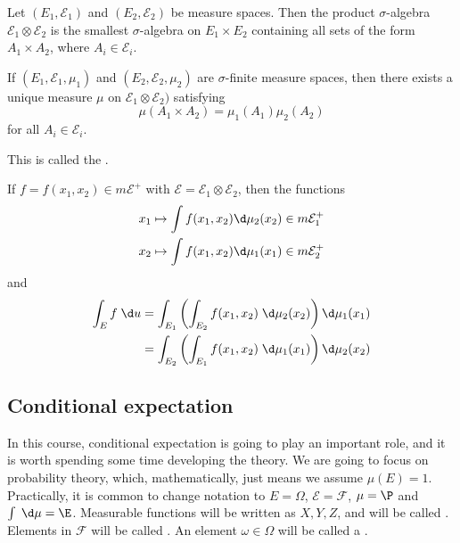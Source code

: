 \documentclass[a4paper]{article}
\begin{document}
\begin{defi}
  Let $(E_1, \mathcal{E}_1)$ and $(E_2 , \mathcal{E}_2)$ be measure spaces. Then the product $\sigma$-algebra$ \mathcal{E}_1 \otimes \mathcal{E}_2$ is the smallest $\sigma$-algebra on $E_1 \times E_2$ containing all sets of the form $A_1 \times A_2$, where $A_i \in \mathcal{E}_i$.
\end{defi}

\begin{thm}
  If $(E_1, \mathcal{E}_1, \mu_1)$ and $(E_2, \mathcal{E}_2, \mu_2)$ are $\sigma$-finite measure spaces, then there exists a unique measure $\mu$ on $\mathcal{E}_1 \otimes \mathcal{E}_2)$ satisfying
  \[
    \mu(A_1 \times A_2) = \mu_1(A_1) \mu_2(A_2)
  \]
  for all $A_i \in \mathcal{E}_i$.

  This is called the .
\end{thm}

\begin{thm}
  If $f = f(x_1, x_2) \in m\mathcal{E}^+$ with $\mathcal{E} = \mathcal{E}_1 \otimes \mathcal{E}_2$, then the functions
  \begin{align*}
    x_1 \mapsto \int f(x_1, x_2) \d \mu_2(x_2) \in m \mathcal{E}_1^+\\
    x_2 \mapsto \int f(x_1, x_2) \d \mu_1(x_1) \in m \mathcal{E}_2^+
  \end{align*}
  and
  \begin{align*}
    \int_E f \;\d u &= \int_{E_1} \left(\int_{E_2} f(x_1, x_2)\;\d \mu_2(x_2)\right) \d \mu_1(x_1)\\
    &= \int_{E_2} \left(\int_{E_1} f(x_1, x_2)\;\d \mu_1(x_1)\right) \d \mu_2(x_2)
  \end{align*}
\end{thm}
\subsection{Conditional expectation}
In this course, conditional expectation is going to play an important role, and it is worth spending some time developing the theory. We are going to focus on probability theory, which, mathematically, just means we assume $\mu(E) = 1$. Practically, it is common to change notation to $E = \Omega$, $\mathcal{E} = \mathcal{F}$, $\mu = \P$ and $\int\;\d \mu = \E$. Measurable functions will be written as $X, Y, Z$, and will be called . Elements in $\mathcal{F}$ will be called . An element $\omega \in \Omega$ will be called a .
\end{document}

